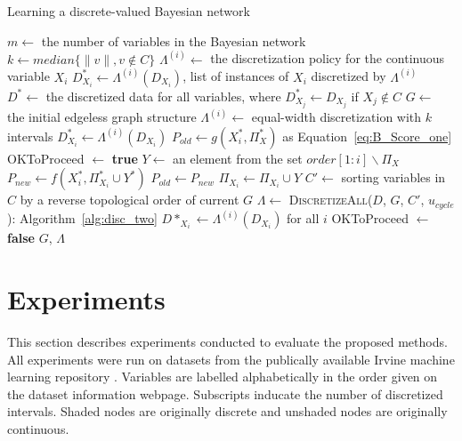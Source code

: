 \begin{algorithm}
  \caption{Learning a discrete-valued Bayesian network}
  \label{alg:structure_learn}
  \begin{algorithmic}[5]
    \State $m \leftarrow$ the number of variables in the Bayesian network
    \State $k \leftarrow median\{ \|v\|, v\notin C\}$
    \State $\Lambda^{(i)} \leftarrow$ the discretization policy for the continuous variable $X_i$
    \State $D^*_{X_i} \leftarrow \Lambda^{(i)} (D_{X_i})$, list of instances of $X_i$ discretized by $\Lambda^{(i)}$
    \State $D^* \leftarrow $ the discretized data for all variables, where $D^*_{X_j} \leftarrow D_{X_j}$ if $X_j \notin C$
    \State $G \leftarrow$ the initial edgeless graph structure
        \State $\Lambda^{(i)} \leftarrow$ equal-width discretization with $k$ intervals
        \State $D^*_{X_i} \leftarrow  \Lambda^{(i)} (D_{X_i})$
      \EndIf
    \EndFor
      \State $P_{old} \leftarrow g(X^*_i,\Pi^*_X)$ as Equation~\ref{eq:B_Score_one}
      \State OKToProceed $\leftarrow$ \textbf{true}
        \State $Y \leftarrow$ an element from the set $order[1:i] \backslash \Pi_X$
        \State $P_{new} \leftarrow f(X^*_i,\Pi^*_{X_i} \cup Y^*)$
          \State $P_{old} \leftarrow P_{new}$
          \State $\Pi_{X_i} \leftarrow \Pi_{X_i} \cup Y $
          \State $C' \leftarrow$ sorting variables in $C$ by a reverse topological order of current $G$
          \State $\Lambda \leftarrow$ \textsc{DiscretizeAll}({$D$, $G$, $C'$, $u_{cycle}$}): Algorithm~\ref{alg:disc_two}
          \State $D*_{X_i} \leftarrow \Lambda^{(i)}(D_{X_i})$ for all $i$
        \Else
          \State OKToProceed $\leftarrow$ \textbf{false}
        \EndIf
      \EndWhile
    \EndFor
    \State \Return $G$, $\Lambda$
  \EndFunction
  \end{algorithmic}
\end{algorithm}


\section{Experiments}
\label{sec:experiments}

This section describes experiments conducted to evaluate the proposed methods.
All experiments were run on datasets from the publically available Irvine machine learning repository \citep{Lichman_2013}.
Variables are labelled alphabetically in the order given on the dataset information webpage.
Subscripts inducate the number of discretized intervals.
Shaded nodes are originally discrete and unshaded nodes are originally continuous.

